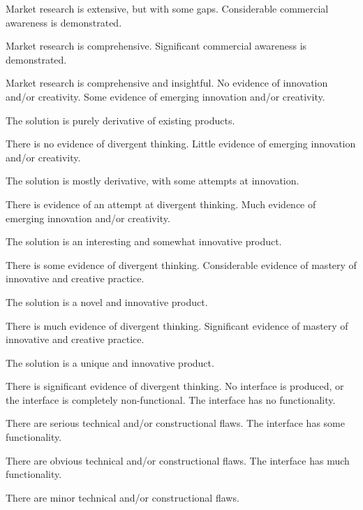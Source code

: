 \documentclass{../../fal_assignment}
\begin{document}
\begin{markingrubric}
            \par Market research is extensive, but with some gaps.
        \grade Considerable commercial awareness is demonstrated.
            \par Market research is comprehensive.
        \grade Significant commercial awareness is demonstrated.
            \par Market research is comprehensive and insightful.
%
        \grade\fail No evidence of innovation and/or creativity.
        \grade Some evidence of emerging innovation and/or creativity.
            \par The solution is purely derivative of existing products.
            \par There is no evidence of divergent thinking.
        \grade Little evidence of emerging innovation and/or creativity.
            \par The solution is mostly derivative, with some attempts at innovation.
            \par There is evidence of an attempt at divergent thinking.
        \grade Much evidence of emerging innovation and/or creativity.
            \par The solution is an interesting and somewhat innovative product.
            \par There is some evidence of divergent thinking.
        \grade Considerable evidence of mastery of innovative and creative practice.
            \par The solution is a novel and innovative product.
            \par There is much evidence of divergent thinking.
        \grade Significant evidence of mastery of innovative and creative practice.
            \par The solution is a unique and innovative product.
            \par There is significant evidence of divergent thinking.
%            
        \grade\fail No interface is produced, or the interface is completely non-functional.
        \grade The interface has no functionality.
            \par There are serious technical and/or constructional flaws.
        \grade The interface has some functionality.
            \par There are obvious technical and/or constructional flaws.
        \grade The interface has much functionality.
            \par There are minor technical and/or constructional flaws.

\end{markingrubric}
\end{document}

